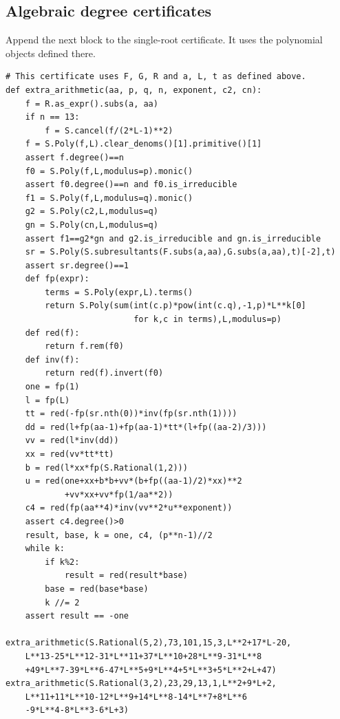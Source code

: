 \documentclass[11pt]{article}
\begin{document}
\subsection{Algebraic degree certificates}
Append the next block to the single-root certificate. It uses
the polynomial objects defined there.
\begin{verbatim}
# This certificate uses F, G, R and a, L, t as defined above.
def extra_arithmetic(aa, p, q, n, exponent, c2, cn):
    f = R.as_expr().subs(a, aa)
    if n == 13:
        f = S.cancel(f/(2*L-1)**2)
    f = S.Poly(f,L).clear_denoms()[1].primitive()[1]
    assert f.degree()==n
    f0 = S.Poly(f,L,modulus=p).monic()
    assert f0.degree()==n and f0.is_irreducible
    f1 = S.Poly(f,L,modulus=q).monic()
    g2 = S.Poly(c2,L,modulus=q)
    gn = S.Poly(cn,L,modulus=q)
    assert f1==g2*gn and g2.is_irreducible and gn.is_irreducible
    sr = S.Poly(S.subresultants(F.subs(a,aa),G.subs(a,aa),t)[-2],t)
    assert sr.degree()==1
    def fp(expr):
        terms = S.Poly(expr,L).terms()
        return S.Poly(sum(int(c.p)*pow(int(c.q),-1,p)*L**k[0]
                          for k,c in terms),L,modulus=p)
    def red(f):
        return f.rem(f0)
    def inv(f):
        return red(f).invert(f0)
    one = fp(1)
    l = fp(L)
    tt = red(-fp(sr.nth(0))*inv(fp(sr.nth(1))))
    dd = red(l+fp(aa-1)+fp(aa-1)*tt*(l+fp((aa-2)/3)))
    vv = red(l*inv(dd))
    xx = red(vv*tt*tt)
    b = red(l*xx*fp(S.Rational(1,2)))
    u = red(one+xx+b*b+vv*(b+fp((aa-1)/2)*xx)**2
            +vv*xx+vv*fp(1/aa**2))
    c4 = red(fp(aa**4)*inv(vv**2*u**exponent))
    assert c4.degree()>0
    result, base, k = one, c4, (p**n-1)//2
    while k:
        if k%2:
            result = red(result*base)
        base = red(base*base)
        k //= 2
    assert result == -one

extra_arithmetic(S.Rational(5,2),73,101,15,3,L**2+17*L-20,
    L**13-25*L**12-31*L**11+37*L**10+28*L**9-31*L**8
    +49*L**7-39*L**6-47*L**5+9*L**4+5*L**3+5*L**2+L+47)
extra_arithmetic(S.Rational(3,2),23,29,13,1,L**2+9*L+2,
    L**11+11*L**10-12*L**9+14*L**8-14*L**7+8*L**6
    -9*L**4-8*L**3-6*L+3)
\end{verbatim}
\end{document}
